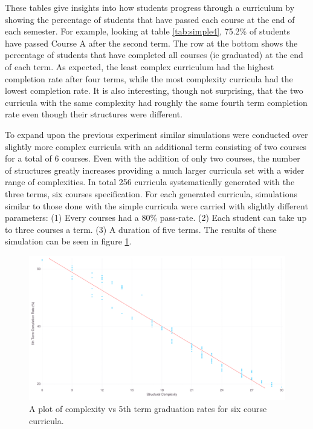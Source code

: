 \documentclass[botnum, fleqn]{unmeethesis}
\begin{document}
    These tables give insights into how students progress through a curriculum by showing the percentage of students that have passed each course at the end of each semester. For example, looking at table \ref{tab:simple4}, 75.2\% of students have passed Course A after the second term. The row at the bottom shows the percentage of students that have completed all courses (ie graduated) at the end of each term. As expected, the least complex curriculum had the highest completion rate after four terms, while the most complexity curricula had the lowest completion rate. It is also interesting, though not surprising, that the two curricula with the same complexity had roughly the same fourth term completion rate even though their structures were different.

    To expand upon the previous experiment similar simulations were conducted over slightly more complex curricula with an additional term consisting of two courses for a total of 6 courses. Even with the addition of only two courses, the number of structures greatly increases providing a much larger curricula set with a wider range of complexities. In total 256 curricula systematically generated with the three terms, six courses specification. For each generated curricula, simulations similar to those done with the simple curricula were carried with slightly different parameters: (1) Every courses had a 80\% pass-rate. (2) Each student can take up to three courses a term. (3) A duration of five terms. The results of these simulation can be seen in figure \ref{fig:gen6results}.

    \begin{figure}[h!]
      \centerline{\includegraphics[scale=0.25]{./figures/gradRate5_v_Complexity.png}}
      \caption{A plot of complexity vs 5th term graduation rates for six course curricula.} 
      \label{fig:gen6results}
    \end{figure}
\end{document}
